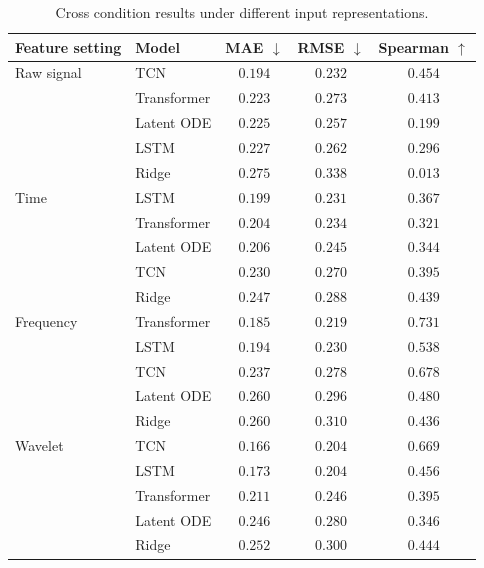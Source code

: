 \documentclass{article}
\begin{document}
\begin{table}[ht]
    \centering
    \small
    \caption{
    Cross condition results under different input representations.
    }
    \label{tab:representation_results}
    \begin{tabular}{llccc}
        \toprule
        Feature setting & Model & MAE $\downarrow$ & RMSE $\downarrow$ & Spearman $\uparrow$ \\
        \midrule

        {Raw signal}
        & TCN & $\mathbf{0.194}$ & $\mathbf{0.232}$ & $\mathbf{0.454}$ \\
        & Transformer & $0.223$ & $0.273$ & $0.413$ \\
        & Latent ODE & $0.225$ & $0.257$ & $0.199$ \\
        & LSTM & $0.227$ & $0.262$ & $0.296$ \\
        & Ridge & $0.275$ & $0.338$ & $0.013$ \\

        \midrule
        {Time}
        & LSTM & $\mathbf{0.199}$ & $\mathbf{0.231}$ & $0.367$ \\
        & Transformer & $0.204$ & $0.234$ & $0.321$ \\
        & Latent ODE & $0.206$ & $0.245$ & $0.344$ \\
        & TCN & $0.230$ & $0.270$ & $0.395$ \\
        & Ridge & $0.247$ & $0.288$ & $\mathbf{0.439}$ \\

        \midrule
        {Frequency}
        & Transformer & $\mathbf{0.185}$ & $\mathbf{0.219}$ & $\mathbf{0.731}$ \\
        & LSTM & $0.194$ & $0.230$ & $0.538$ \\
        & TCN & $0.237$ & $0.278$ & $0.678$ \\
        & Latent ODE & $0.260$ & $0.296$ & $0.480$ \\
        & Ridge & $0.260$ & $0.310$ & $0.436$ \\

        \midrule
        {Wavelet}
        & TCN & $\mathbf{0.166}$ & $\mathbf{0.204}$ & $\mathbf{0.669}$ \\
        & LSTM & $0.173$ & $0.204$ & $0.456$ \\
        & Transformer & $0.211$ & $0.246$ & $0.395$ \\
        & Latent ODE & $0.246$ & $0.280$ & $0.346$ \\
        & Ridge & $0.252$ & $0.300$ & $0.444$ \\

        \bottomrule
    \end{tabular}
\end{table}
\end{document}
